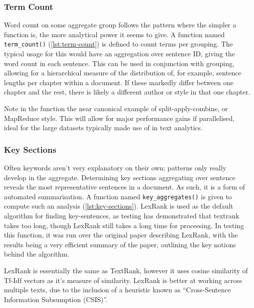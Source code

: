 \documentclass[11pt, a4paper, titlepage]{report}
\begin{document}
\subsubsection{Term Count}\label{sec:term-count}

Word count on some aggregate group follows the pattern where the
simpler a function is, the more analytical power it seems to give. A
function named \texttt{term_count()}
(\underline{\cref{lst:term-count}}) is defined to count terms per
grouping. The typical usage for this would have an aggregation over
sentence ID, giving the word count in each sentence. This can be used
in conjunction with grouping, allowing for a hierarchical measure of
the distribution of, for example, sentence lengths per chapter within
a document. If these markedly differ between one chapter and the rest,
there is likely a different author or style in that one chapter.

Note in the function the near canonical example of
split-apply-combine, or MapReduce style. This will allow for major
performance gains if parallelised, ideal for the large datasets
typically made use of in text analytics.

\subsubsection{Key Sections}\label{sec:key-section}

Often keywords aren't very explanatory on their own; patterns only
really develop in the aggregate. Determining key sections aggregating
over sentence reveals the most representative sentences in a document.
As such, it is a form of automated summarisation. A function named
\texttt{key_aggregates()} is given to compute such an analysis
(\underline{\cref{lst:key-sections}}). LexRank is used as the default
algorithm for finding key-sentences, as testing has demonstrated that
textrank takes too long, though LexRank still takes a long time for
processing\autocite{spannbauer19}. In testing this function, it was
run over the original paper describing LexRank, with the results being
a very efficient summary of the paper, outlining the key notions
behind the algorithm.

LexRank is essentially the same as TextRank, however it uses cosine
similarity of Tf-Idf vectors as it's measure of similarity. LexRank is
better at working across multiple texts, due to the inclusion of a
heuristic known as ``Cross-Sentence Information Subsumption (CSIS)''.
\end{document}
